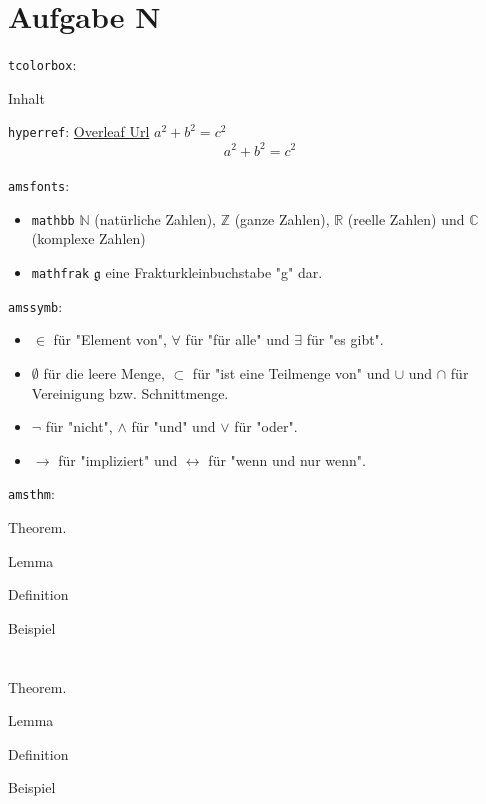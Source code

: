 \documentclass{article}
\begin{document}
\section{Aufgabe N}
\lipsum[1]
\newline
\texttt{tcolorbox}:
\begin{tcolorbox}[colback=red!5!white,colframe=red!60!black,title=Überschrift]
    Inhalt
\end{tcolorbox}
\texttt{hyperref}: \href{https://overleaf.com/}{Overleaf Url}
\newline
$a^2 + b^2 = c^2$
$$a^2 + b^2 = c^2$$
\\
\texttt{amsfonts}:
\begin{itemize}
    \item \texttt{mathbb} $\mathbb{N}$ (natürliche Zahlen), $\mathbb{Z}$ (ganze Zahlen), $\mathbb{R}$ (reelle Zahlen) und $\mathbb{C}$ (komplexe Zahlen)
    \item \texttt{mathfrak} $\mathfrak{g}$ eine Frakturkleinbuchstabe "g" dar.
\end{itemize}
\texttt{amssymb}:
\begin{itemize}
    \item $\in$ für "Element von", $\forall$ für "für alle" und $\exists$ für "es gibt".
    \item  $\emptyset$ für die leere Menge, $\subset$ für "ist eine Teilmenge von" und $\cup$ und $\cap$ für Vereinigung bzw. Schnittmenge.
    \item  $\neg$ für "nicht", $\wedge$ für "und" und $\vee$ für "oder".
    \item $\rightarrow$ für "impliziert" und $\leftrightarrow$ für "wenn und nur wenn".
\end{itemize}
\texttt{amsthm}:
\begin{theorem}
Theorem.
\end{theorem}
\begin{lemma}
Lemma
\end{lemma}
\begin{definition}
Definition
\end{definition}
\begin{example}
Beispiel
\end{example}
\section{}
\begin{theorem}
Theorem.
\end{theorem}
\begin{lemma}
Lemma
\end{lemma}
\begin{definition}
Definition
\end{definition}
\begin{example}
Beispiel
\end{example}
\end{document}
